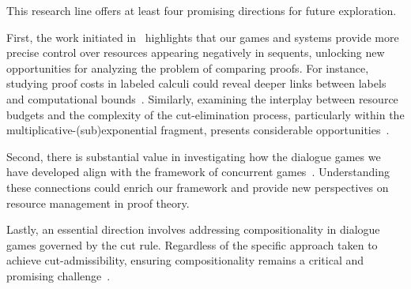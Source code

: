 
This research line offers at least four promising directions for future exploration.

First, the work initiated in~\cite{DBLP:conf/tableaux/LangOPF19} highlights that our games and systems provide more precise control over resources appearing negatively in sequents, unlocking new opportunities for analyzing the problem of comparing proofs. For instance, studying proof costs in labeled calculi could reveal deeper links between labels and computational bounds~\cite{DBLP:journals/jfp/AccattoliGK20}. Similarly, examining the interplay between resource budgets and the complexity of the cut-elimination process, particularly within the multiplicative-(sub)exponential fragment, presents considerable opportunities~\cite{DBLP:journals/tcs/Strassburger03,DBLP:journals/tocl/StrassburgerG11}.

Second, there is substantial value in investigating how the dialogue games we
have developed align with the framework of concurrent
games~\cite{DBLP:conf/lics/AbramskyM99,DBLP:conf/lics/FaggianM05,DBLP:journals/lmcs/CastellanCRW17}.
Understanding these connections could enrich our framework and provide new
perspectives on resource management in proof theory.


Lastly, an essential direction involves addressing compositionality in dialogue games governed by the cut rule. Regardless of the specific approach taken to achieve cut-admissibility, ensuring compositionality remains a critical and promising challenge~\cite{dutilh18}.
